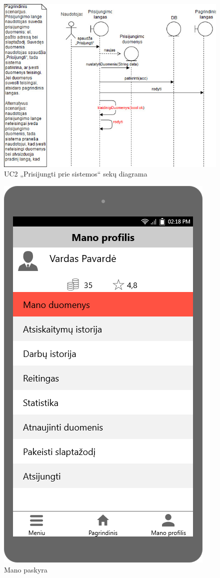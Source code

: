 \documentclass{VUMIFPSbakalaurinis}
\begin{document}
\begin{figure}[H]
	\centering
	\includegraphics[scale=0.6]{img/Sequence/2sequence}
	\caption{UC2 „Prisijungti prie sistemos“ sekų diagrama}
	\label{img:uc2seq}
\end{figure}

\begin{figure}[H]
	\centering
	\includegraphics[scale=0.4]{img/ScreenShots/Mano_profilis/00-Mano-profilis}
	\caption{Mano paskyra}
	\label{img:profile}
\end{figure}
\end{document}
